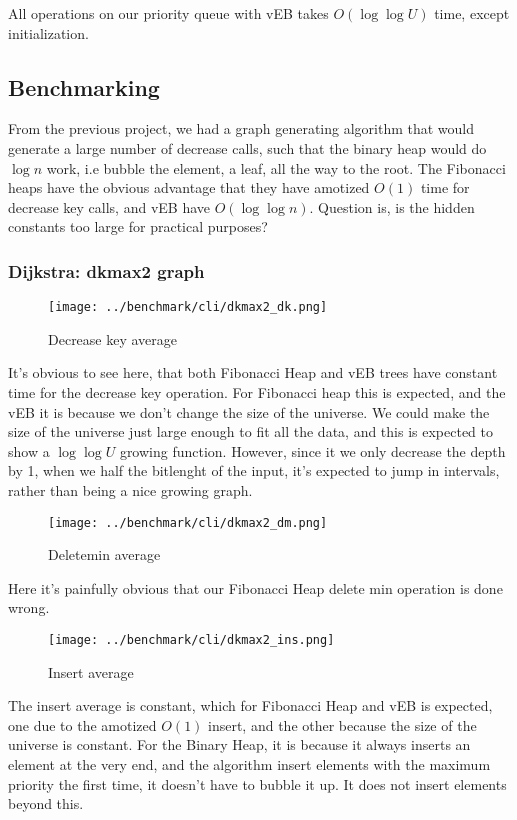 All operations on our priority queue with vEB takes $O(\log \log U)$ time, except initialization.

\subsection*{Benchmarking}
From the previous project, we had a graph generating algorithm that would generate a large number of decrease calls, such that the binary heap would do $\log n$ work, i.e bubble the element, a leaf, all the way to the root. The Fibonacci heaps have the obvious advantage that they have amotized $O(1)$ time for decrease key calls, and vEB have $O(\log \log n)$. Question is, is the hidden constants too large for practical purposes?

\subsubsection*{Dijkstra: dkmax2 graph}
\begin{figure}[htb]
\centering
\texttt{[image: ../benchmark/cli/dkmax2\_dk.png]}
\caption{Decrease key average}
\label{fig:dkmax2-dk}
\end{figure}

It's obvious to see here, that both Fibonacci Heap and vEB trees have constant time for the decrease key operation. For Fibonacci heap this is expected, and the vEB it is because we don't change the size of the universe. We could make the size of the universe just large enough to fit all the data, and this is expected to show a $\log \log U$ growing function. However, since it we only decrease the depth by 1, when we half the bitlenght of the input, it's expected to jump in intervals, rather than being a nice growing graph.

\begin{figure}[htb]
\centering
\texttt{[image: ../benchmark/cli/dkmax2\_dm.png]}
\caption{Deletemin average}
\label{fig:dkmax2-dm}
\end{figure}

Here it's painfully obvious that our Fibonacci Heap delete min operation is done wrong.

\begin{figure}[htb]
\centering
\texttt{[image: ../benchmark/cli/dkmax2\_ins.png]}
\caption{Insert average}
\label{fig:dkmax2-ins}
\end{figure}

The insert average is constant, which for Fibonacci Heap and vEB is expected, one due to the amotized $O(1)$ insert, and the other because the size of the universe is constant. For the Binary Heap, it is because it always inserts an element at the very end, and the algorithm insert elements with the maximum priority the first time, it doesn't have to bubble it up. It does not insert elements beyond this.

